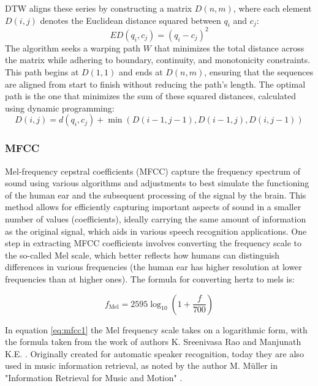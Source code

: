 DTW aligns these series by constructing a matrix \( D(n,m) \), where each element \( D(i,j) \) denotes the Euclidean distance squared between \( q_i \) and \( c_j \):
\begin{equation}
\label{eq25}
E D\left(q_i, c_j\right)=\left(q_i-c_j\right)^2
\end{equation}
The algorithm seeks a warping path \( W \) that minimizes the total distance across the matrix while adhering to boundary, continuity, and monotonicity constraints. This path begins at \( D(1,1) \) and ends at \( D(n,m) \), ensuring that the sequences are aligned from start to finish without reducing the path’s length. The optimal path is the one that minimizes the sum of these squared distances, calculated using dynamic programming:
\begin{equation}
\label{eq26}
D(i, j)=d\left(q_i, c_j\right)+\min (D(i-1, j-1), D(i-1, j), D(i, j-1))
\end{equation}

\subsubsection{MFCC}

Mel-frequency cepstral coefficients (MFCC) capture the frequency spectrum of sound using various algorithms and adjustments to best simulate the functioning of the human ear and the subsequent processing of the signal by the brain. This method allows for efficiently capturing important aspects of sound in a smaller number of values (coefficients), ideally carrying the same amount of information as the original signal, which aids in various speech recognition applications. One step in extracting MFCC coefficients involves converting the frequency scale to the so-called Mel scale, which better reflects how humans can distinguish differences in various frequencies (the human ear has higher resolution at lower frequencies than at higher ones). The formula for converting hertz to mels is:

\begin{equation}
\label{eq:mfcc1}
f_{\mathrm{Mel}}=2595 \log _{10}\left(1+\frac{f}{700}\right)
\end{equation}

In equation \ref{eq:mfcc1} the Mel frequency scale takes on a logarithmic form, with the formula taken from the work of authors K. Sreenivasa Rao and Manjunath K.E. \cite{Singh2014MFCC}. Originally created for automatic speaker recognition, today they are also used in music information retrieval, as noted by the author M. Müller in "Information Retrieval for Music and Motion" \cite{Muller2007MusicMotion}.

